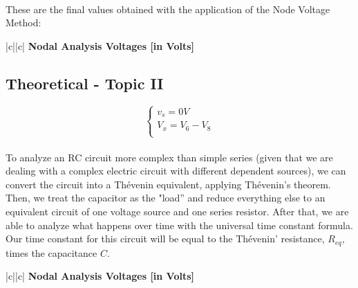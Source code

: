 \paragraph{}
These are the final values obtained with the application of the Node Voltage Method:

\begin{center}
   \begin{tabular}{|c||c|}
      \hline    
       {\bf Nodal Analysis Voltages [in Volts]} \\
      \hline
        
   \end{tabular}
 \end{center}


\subsection{Theoretical - Topic II}
\label{subsec:second_topic}

\[
\left\{\begin{matrix}
v_s=0V\\
V_x=V_6-V_8\\
\end{matrix}\right.
\]

\paragraph{}
To analyze an RC circuit more complex than simple series (given that we are dealing with a complex electric circuit with different dependent sources), we can convert the circuit into a Thévenin equivalent, applying Thévenin's theorem. Then, we treat the capacitor as the "load” and reduce everything else to an equivalent circuit of one voltage source and one series resistor. After that, we are able to analyze what happens over time with the universal time constant formula. Our time constant for this circuit will be equal to the Thévenin' resistance, $R_{eq} $, times the capacitance $C$.

\begin{center}
   \begin{tabular}{|c||c|}
      \hline    
       {\bf Nodal Analysis Voltages [in Volts]} \\
      \hline
        
   \end{tabular}
 \end{center}
 

